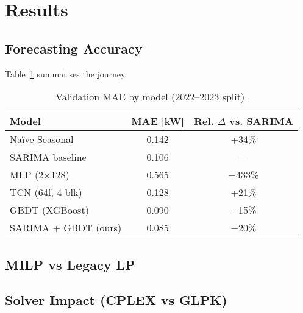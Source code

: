 \newpage
\section{Results}

\subsection{Forecasting Accuracy}

Table~\ref{tab:model-comp} summarises the journey.

\begin{table}[h]
\centering
\caption{Validation MAE by model (2022–2023 split).}
\label{tab:model-comp}
\begin{tabular}{lcc}
\hline
Model & MAE [kW] & Rel. $\Delta$ vs. SARIMA \\
\hline
Naïve Seasonal      & 0.142 & +34\% \\
SARIMA baseline     & 0.106 & — \\
MLP (2×128)         & 0.565 & +433\% \\
TCN (64f, 4 blk)    & 0.128 & +21\% \\
GBDT (XGBoost)      & 0.090 & $-$15\% \\
SARIMA + GBDT (ours)& 0.085 & $-$20\% \\
\hline
\end{tabular}
\end{table}

\subsection{MILP vs Legacy LP}

\subsection{Solver Impact (CPLEX vs GLPK)}

